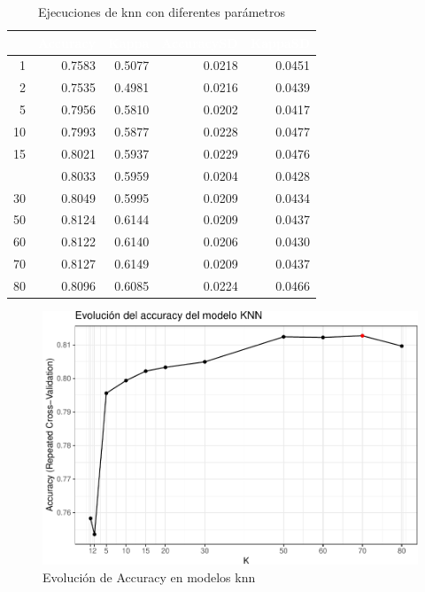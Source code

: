\begin{table}[!h]
	
	\caption{\label{tab:knn_corridas_parametros} Ejecuciones de knn con diferentes parámetros}
	\centering
	\begin{tabular}[t]{rrrrr}
		\toprule
		\rowcolor{black}  \multicolumn{1}{c}{\textcolor{white}{\textbf{k}}} & \multicolumn{1}{c}{\textcolor{white}{\textbf{Accuracy}}} & \multicolumn{1}{c}{\textcolor{white}{\textbf{Kappa}}} & \multicolumn{1}{c}{\textcolor{white}{\textbf{AccuracySD}}} & \multicolumn{1}{c}{\textcolor{white}{\textbf{KappaSD}}}\\
		\midrule
		\rowcolor{gray!6}  1 & 0.7583 & 0.5077 & 0.0218 & 0.0451\\
		2 & 0.7535 & 0.4981 & 0.0216 & 0.0439\\
		\rowcolor{gray!6}  5 & 0.7956 & 0.5810 & 0.0202 & 0.0417\\
		10 & 0.7993 & 0.5877 & 0.0228 & 0.0477\\
		\rowcolor{gray!6}  15 & 0.8021 & 0.5937 & 0.0229 & 0.0476\\
		\addlinespace
		20 & 0.8033 & 0.5959 & 0.0204 & 0.0428\\
		\rowcolor{gray!6}  30 & 0.8049 & 0.5995 & 0.0209 & 0.0434\\
		50 & 0.8124 & 0.6144 & 0.0209 & 0.0437\\
		\rowcolor{gray!6}  60 & 0.8122 & 0.6140 & 0.0206 & 0.0430\\
		70 & 0.8127 & 0.6149 & 0.0209 & 0.0437\\
		\addlinespace
		\rowcolor{gray!6}  80 & 0.8096 & 0.6085 & 0.0224 & 0.0466\\
		\bottomrule
	\end{tabular}
\end{table}

\begin{figure}[!htb]
	\centering
	\includegraphics{imagenes/modelos_varios/unnamed-chunk-13-1.pdf}
	\caption{Evolución de Accuracy en modelos knn}
	\label{fig:knn_k_evolucion_accuracy}
\end{figure}


